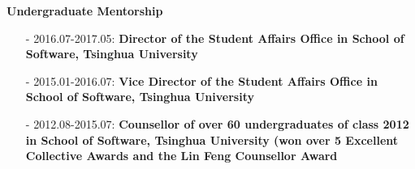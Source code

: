 \documentclass[margin]{cv}
\begin{document}
\begin{resume}
{\bf Undergraduate Mentorship}

\leftmargini=4mm
\begin{itemize}
\item[-] 2016.07-2017.05: {\bf Director of the Student Affairs Office in School of Software, Tsinghua University}
\item[-] 2015.01-2016.07: {\bf Vice Director of the Student Affairs Office in School of Software, Tsinghua University}
\item[-] 2012.08-2015.07: {\bf Counsellor of over 60 undergraduates of class 2012 in School of Software, Tsinghua University (won over 5 Excellent Collective Awards and the Lin Feng Counsellor Award}
\end{itemize}

\end{resume}
\end{document}
